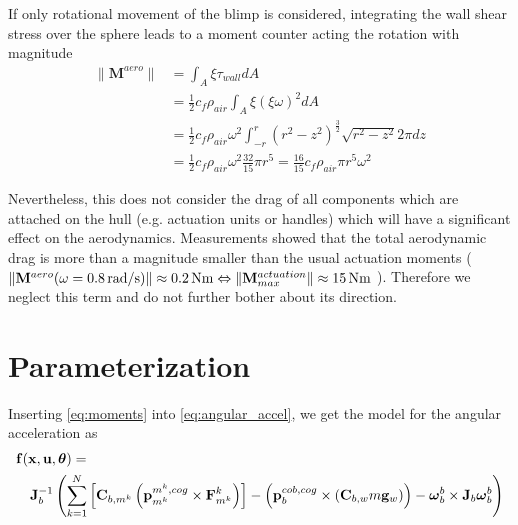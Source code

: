 If only rotational movement of the blimp is considered, integrating the wall shear stress over the sphere leads to a moment counter acting the rotation with magnitude
\begin{align*}
\| \mathbf{M}^{aero} \|
&= \int_A \xi \tau_{wall} dA \\
&= \frac{1}{2} c_f \rho_{air} \int_A \xi (\xi \omega)^2 dA \\
&= \frac{1}{2} c_f \rho_{air} \omega^2 \int_{-r}^{r} (r^2-z^2)^{\frac{3}{2}} \sqrt{r^2-z^2} 2\pi dz \\
&= \frac{1}{2} c_f \rho_{air} \omega^2 \frac{32}{15} \pi r^5
 = \frac{16}{15} c_f \rho_{air} \pi r^5 \omega^2
\end{align*}

Nevertheless, this does not consider the drag of all components which are attached on the hull (e.g. actuation units or handles) which will have a significant effect on the aerodynamics.
Measurements showed that the total aerodynamic drag is more than a magnitude smaller than the usual actuation moments (
$\|\mathbf{M}^{aero}(\omega = \unit[0.8]{rad/s})\| \approx \unit[0.2]{Nm} \Leftrightarrow 
\| \mathbf{M}^{actuation}_{max} \| \approx \unit[15]{Nm}$
). Therefore we neglect this term and do not further bother about its direction.

%
%

\section{Parameterization}
\label{sec:parameterization}
Inserting \cref{eq:moments} into \cref{eq:angular_accel}, we get the model for the angular acceleration as
\begin{align}
\lefteqn{ \mathbf{f}(\mathbf{x}, \mathbf{u}, \boldsymbol{\theta}) = {} \label{eq:sys_mod} }\\
& & {} \mathbf{J}_b^{-1} \left( 
\sum_{k=1}^N  \left[  \mathbf{C}_{b,m^k} \left( \mathbf{p}^{m^k,cog}_{m^k} \times \mathbf{F}^k_{m^k} \right)  \right]
-
\left( \mathbf{p}^{cob,cog}_b \times (\mathbf{C}_{b,w}m\mathbf{g}_w) \right)
- \boldsymbol{\omega}_b^b \times \mathbf{J}_b \boldsymbol{\omega}_b^b \right) \nonumber
\end{align}

